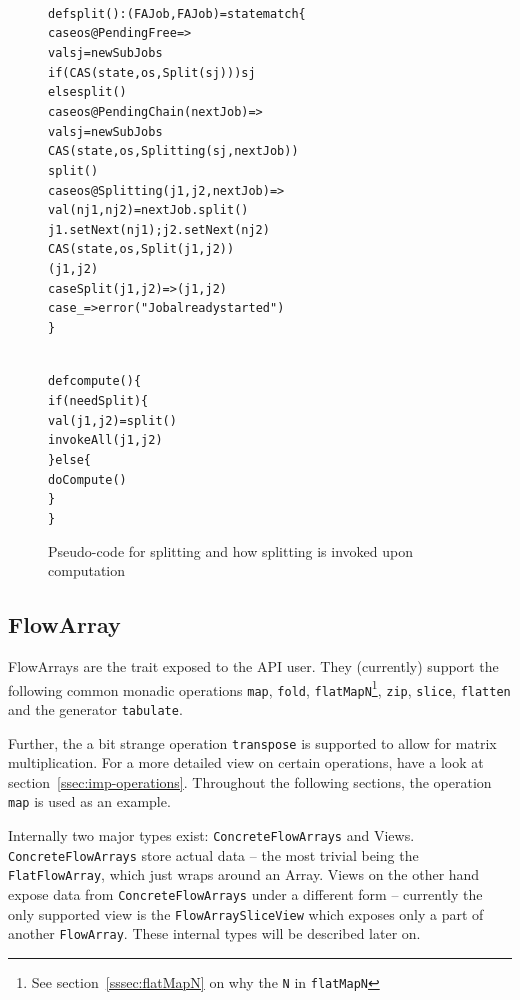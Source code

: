 \documentclass[runningheads,a4paper,fleqn]{llncs}
\begin{document}
\begin{figure}
\begin{minipage}[t]{7cm}
\begin{alltt}
{\scriptsize
def split(): (FAJob, FAJob) = state match \{
  case os@PendingFree =>
    val sj = newSubJobs
    if (CAS(state, os, Split(sj))) sj
    else split()
  case os@PendingChain(nextJob) =>
    val sj = newSubJobs
    CAS(state, os, Splitting(sj, nextJob))
    split()
  case os@Splitting(j1, j2, nextJob) =>
    val (nj1, nj2) = nextJob.split()
    j1.setNext(nj1); j2.setNext(nj2)
    CAS(state, os, Split(j1, j2))
    (j1, j2)
  case Split(j1, j2) => (j1, j2)
  case _ => error("Job already started")
\}
}
\end{alltt}
\end{minipage}
\begin{minipage}[t]{4cm}
\begin{alltt}
{\scriptsize
def compute() \{
  if (needSplit) \{
    val (j1, j2) = split()
    invokeAll(j1, j2)
  \} else \{
    doCompute()
  \}
\}
}
\end{alltt}
\end{minipage}
\caption{Pseudo-code for splitting and how splitting is invoked upon
  computation}
\label{fig:split-code}
\end{figure}

\subsection{FlowArray}
FlowArrays are the trait exposed to the API user. They (currently)
support the following common monadic operations \texttt{map},
\texttt{fold}, \texttt{flatMapN}\footnote{See
  section~\ref{sssec:flatMapN} on why the \texttt{N} in
  \texttt{flatMapN}}, \texttt{zip}, \texttt{slice}, \texttt{flatten}
and the generator \texttt{tabulate}.

Further, the a bit strange operation \texttt{transpose} is supported
to allow for matrix multiplication. For a more detailed view on
certain operations, have a look at
section~\ref{ssec:imp-operations}. Throughout the following sections,
the operation \texttt{map} is used as an example.

Internally two major types exist: \texttt{ConcreteFlowArrays} and
Views. \texttt{ConcreteFlowArrays} store actual data -- the most
trivial being the \texttt{FlatFlowArray}, which just wraps around an
Array. Views on the other hand expose data from
\texttt{ConcreteFlowArrays} under a different form -- currently the
only supported view is the \texttt{FlowArraySliceView} which exposes
only a part of another \texttt{FlowArray}. These internal types will
be described later on.
\end{document}
